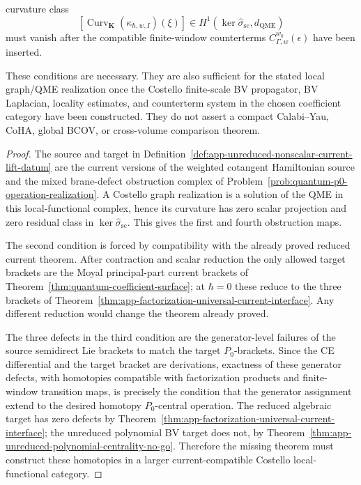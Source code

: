 \begin{prop}
\begin{enumerate}
    curvature class
    \[
      \left[
      \operatorname{Curv}_{\mathbf K}(\kappa_{\hbar,w,I})(\xi)
      \right]
      \in
      H^1\!\left(
        \ker\widehat\sigma_{\mathrm{sc}},
        d_{\mathrm{QME}}
      \right)
    \]
    must vanish after the compatible finite-window counterterms
    \(C_{\Gamma,w}^{w_0}(\epsilon)\) have been inserted.
  \end{enumerate}
  These conditions are necessary.  They are also sufficient for the
  stated local graph/QME realization once the Costello finite-scale BV
  propagator, BV Laplacian, locality estimates, and counterterm system in
  the chosen coefficient category have been constructed.  They do not
  assert a compact Calabi--Yau, CoHA, global BCOV, or cross-volume
  comparison theorem.
\end{prop}

\begin{proof}
  The source and target in
  Definition~\ref{def:app-unreduced-nonscalar-current-lift-datum} are the
  current versions of the weighted cotangent Hamiltonian source and the
  mixed brane-defect obstruction complex of
  Problem~\ref{prob:quantum-p0-operation-realization}.  A Costello graph
  realization is a solution of the QME in this local-functional complex,
  hence its curvature has zero scalar projection and zero residual class
  in \(\ker\widehat\sigma_{\mathrm{sc}}\).  This gives the first and
  fourth obstruction maps.

  The second condition is forced by compatibility with the already proved
  reduced current theorem.  After contraction and scalar reduction the
  only allowed target brackets are the Moyal principal-part current
  brackets of Theorem~\ref{thm:quantum-coefficient-surface}; at
  \(\hbar=0\) these reduce to the three brackets of
  Theorem~\ref{thm:app-factorization-universal-current-interface}.  Any
  different reduction would change the theorem already proved.

  The three defects in the third condition are the generator-level
  failures of the source semidirect Lie brackets to match the target
  \(P_0\)-brackets.  Since the CE differential and the target bracket are
  derivations, exactness of these generator defects, with homotopies
  compatible with factorization products and finite-window transition
  maps, is precisely the condition that the generator assignment extend
  to the desired homotopy \(P_0\)-central operation.  The reduced algebraic
  target has zero defects by
  Theorem~\ref{thm:app-factorization-universal-current-interface}; the
  unreduced polynomial BV target does not, by
  Theorem~\ref{thm:app-unreduced-polynomial-centrality-no-go}.  Therefore
  the missing theorem must construct these homotopies in a larger
  current-compatible Costello local-functional category.
\end{proof}

